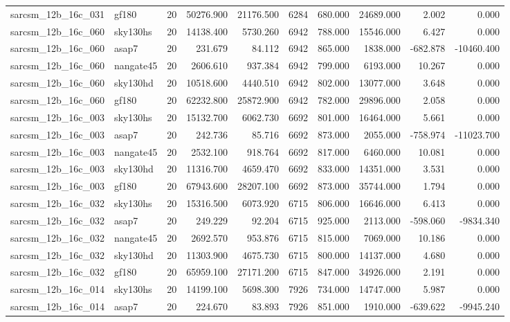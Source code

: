 \begin{longtable}{llrrrrrrrr}
sarcsm\_12b\_16c\_031 & gf180 & 20 & 50276.900 & 21176.500 & 6284 & 680.000 & 24689.000 & 2.002 & 0.000 \\
sarcsm\_12b\_16c\_060 & sky130hs & 20 & 14138.400 & 5730.260 & 6942 & 788.000 & 15546.000 & 6.427 & 0.000 \\
sarcsm\_12b\_16c\_060 & asap7 & 20 & 231.679 & 84.112 & 6942 & 865.000 & 1838.000 & -682.878 & -10460.400 \\
sarcsm\_12b\_16c\_060 & nangate45 & 20 & 2606.610 & 937.384 & 6942 & 799.000 & 6193.000 & 10.267 & 0.000 \\
sarcsm\_12b\_16c\_060 & sky130hd & 20 & 10518.600 & 4440.510 & 6942 & 802.000 & 13077.000 & 3.648 & 0.000 \\
sarcsm\_12b\_16c\_060 & gf180 & 20 & 62232.800 & 25872.900 & 6942 & 782.000 & 29896.000 & 2.058 & 0.000 \\
sarcsm\_12b\_16c\_003 & sky130hs & 20 & 15132.700 & 6062.730 & 6692 & 801.000 & 16464.000 & 5.661 & 0.000 \\
sarcsm\_12b\_16c\_003 & asap7 & 20 & 242.736 & 85.716 & 6692 & 873.000 & 2055.000 & -758.974 & -11023.700 \\
sarcsm\_12b\_16c\_003 & nangate45 & 20 & 2532.100 & 918.764 & 6692 & 817.000 & 6460.000 & 10.081 & 0.000 \\
sarcsm\_12b\_16c\_003 & sky130hd & 20 & 11316.700 & 4659.470 & 6692 & 833.000 & 14351.000 & 3.531 & 0.000 \\
sarcsm\_12b\_16c\_003 & gf180 & 20 & 67943.600 & 28207.100 & 6692 & 873.000 & 35744.000 & 1.794 & 0.000 \\
sarcsm\_12b\_16c\_032 & sky130hs & 20 & 15316.500 & 6073.920 & 6715 & 806.000 & 16646.000 & 6.413 & 0.000 \\
sarcsm\_12b\_16c\_032 & asap7 & 20 & 249.229 & 92.204 & 6715 & 925.000 & 2113.000 & -598.060 & -9834.340 \\
sarcsm\_12b\_16c\_032 & nangate45 & 20 & 2692.570 & 953.876 & 6715 & 815.000 & 7069.000 & 10.186 & 0.000 \\
sarcsm\_12b\_16c\_032 & sky130hd & 20 & 11303.900 & 4675.730 & 6715 & 800.000 & 14137.000 & 4.680 & 0.000 \\
sarcsm\_12b\_16c\_032 & gf180 & 20 & 65959.100 & 27171.200 & 6715 & 847.000 & 34926.000 & 2.191 & 0.000 \\
sarcsm\_12b\_16c\_014 & sky130hs & 20 & 14199.100 & 5698.300 & 7926 & 734.000 & 14747.000 & 5.987 & 0.000 \\
sarcsm\_12b\_16c\_014 & asap7 & 20 & 224.670 & 83.893 & 7926 & 851.000 & 1910.000 & -639.622 & -9945.240 \\

\end{longtable}
